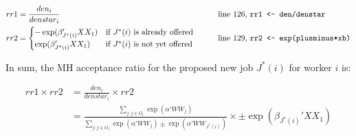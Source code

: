 \documentclass[12pt]{article}
\begin{document}
\begin{align}
rr1 &= \frac{den_i}{denstar_i} &&\qquad \text{line 126, \texttt{rr1 <- den/denstar}} \\
rr2 &= \begin{cases}
-\exp(\beta_{J^*(i)}' XX_1) &\text{if } J^*(i) \text{ is already offered} \\
\exp(\beta_{J^*(i)}' XX_1) &\text{if } J^*(i) \text{ is not yet offered}
\end{cases} &&\qquad \text{line 129, \texttt{rr2 <- exp(plusminus*xb)}}
\end{align}

In sum, the MH acceptance ratio for the proposed new job $J^*(i)$ for worker $i$ is:

\begin{align}
rr1 \times rr2 &= \frac{den_i}{denstar_i} \times rr2 \\
&= 
\frac{\sum\limits_{j: j \in O_i} \exp(
\alpha' WW_j)}{\sum\limits_{j: j \in O_i} \exp(
\alpha' WW_j) \pm \exp(\alpha' WW_{J^*(i)})} \times \pm \exp(\beta_{J^*(i)}' XX_1)
\end{align}
\end{document}

